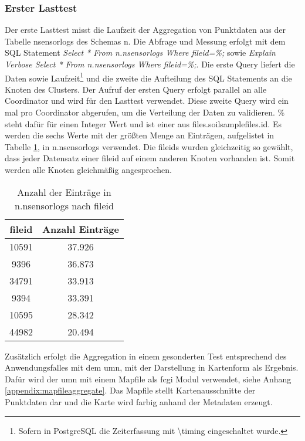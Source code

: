 \subsubsection{Erster Lasttest}
Der erste Lasttest misst die Laufzeit der Aggregation von Punktdaten aus der Tabelle nsensorlogs des Schemas n.
Die Abfrage und Messung erfolgt mit dem SQL Statement \textit{Select * From n.nsensorlogs Where fileid=\%{};} sowie \textit{Explain Verbose Select * From n.nsensorlogs Where fileid=\%{};}.
Die erste Query liefert die Daten sowie Laufzeit\footnote{Sofern in PostgreSQL die Zeiterfassung mit \textbackslash{}timing eingeschaltet wurde.} und die zweite die Aufteilung des SQL Statements an die Knoten des Clusters.
Der Aufruf der ersten Query erfolgt parallel an alle Coordinator und wird für den Lasttest verwendet.
Diese zweite Query wird ein mal pro Coordinator abgerufen, um die Verteilung der Daten zu validieren.
\%{} steht dafür für einen Integer Wert und ist einer aus files.soilsamplefiles.id.
Es werden die sechs Werte mit der größten Menge an Einträgen, aufgelistet in Tabelle \ref{tbl:entrysnnsensorlogs}, in n.nsensorlogs verwendet.
Die fileids wurden gleichzeitig so gewählt, dass jeder Datensatz einer fileid auf einem anderen Knoten vorhanden ist.
Somit werden alle Knoten gleichmäßig angesprochen.
\begin{table}[h!]
\centering
\small
\begin{tabular}{c|c}
\textbf{fileid} & \textbf{Anzahl Einträge} \\ \hline
10591 & 37.926 \\ \hline	%
9396 & 36.873 \\ \hline		%
34791 & 33.913 \\ \hline 	%
9394 & 33.391 \\ \hline 	%
10595 & 28.342 \\ \hline	%
44982 & 20.494 \\ 			%
\end{tabular}
\caption{Anzahl der Einträge in n.nsensorlogs nach fileid}
\label{tbl:entrysnnsensorlogs}
\end{table}
Zusätzlich erfolgt die Aggregation in einem gesonderten Test entsprechend des Anwendungsfalles mit dem \Gls{umn}, mit der Darstellung in Kartenform als Ergebnis.
Dafür wird der \Gls{umn} mit einem Mapfile als \Gls{fcgi} Modul verwendet, siehe Anhang \ref{appendix:mapfileaggregate}.
Das Mapfile stellt Kartenausschnitte der Punktdaten dar und die Karte wird farbig anhand der Metadaten erzeugt.



